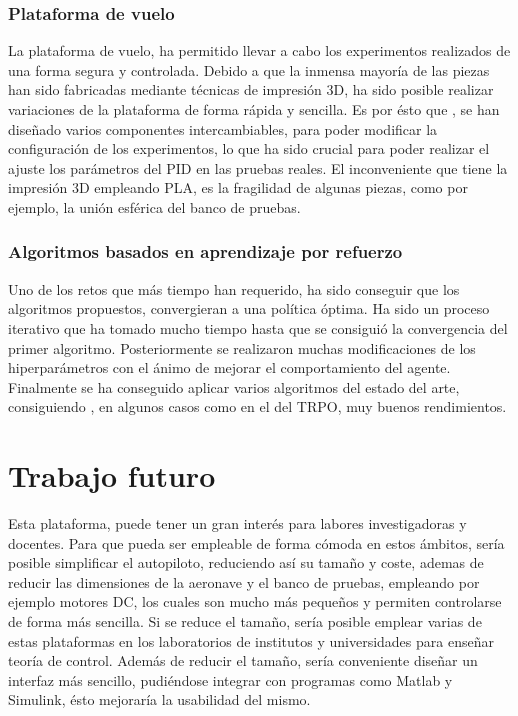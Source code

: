 \subsubsection{Plataforma de vuelo}
La plataforma de vuelo, ha permitido llevar a cabo los experimentos realizados de una forma segura y controlada. Debido a que la inmensa mayoría de las piezas han sido fabricadas mediante técnicas de impresión 3D, ha sido posible realizar variaciones de la plataforma de forma rápida y sencilla. Es por ésto que ,  se han diseñado varios componentes intercambiables, para poder modificar la configuración de los experimentos, lo que ha sido crucial para poder realizar el ajuste los parámetros del PID en las pruebas reales. El inconveniente que tiene la impresión 3D empleando PLA, es la fragilidad de algunas piezas, como por ejemplo, la unión esférica del banco de pruebas.

\subsubsection{Algoritmos basados en aprendizaje por refuerzo}

Uno de los retos que más tiempo han requerido, ha sido conseguir que los algoritmos propuestos, convergieran a una política óptima. Ha sido un proceso iterativo que ha tomado mucho tiempo hasta que se consiguió la convergencia del primer algoritmo. Posteriormente se realizaron muchas modificaciones de los hiperparámetros con el ánimo de mejorar el comportamiento del agente. Finalmente se ha conseguido aplicar varios algoritmos del estado del arte, consiguiendo , en algunos casos como en el del TRPO, muy buenos rendimientos.

\section{Trabajo futuro}

Esta plataforma, puede tener un gran interés para labores investigadoras y docentes. Para que pueda ser empleable de forma cómoda en estos ámbitos, sería posible simplificar el autopiloto, reduciendo así su tamaño y coste, ademas de reducir las dimensiones de la aeronave y el banco de pruebas, empleando por ejemplo motores DC, los cuales son mucho más pequeños y permiten controlarse de forma más sencilla. Si se reduce el tamaño, sería posible emplear varias de estas plataformas en los laboratorios de institutos y universidades para enseñar teoría de control. Además de reducir el tamaño, sería conveniente diseñar un interfaz más sencillo, pudiéndose integrar con programas como Matlab y Simulink, ésto mejoraría la usabilidad del mismo.


